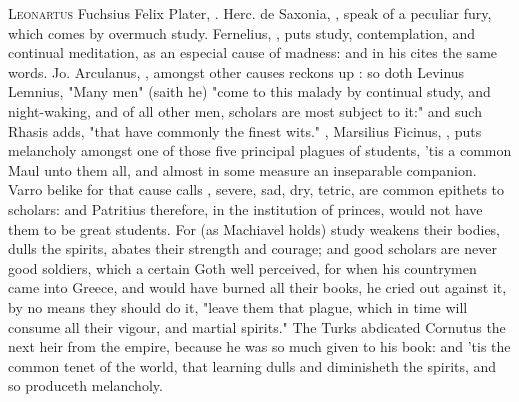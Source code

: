\lettrine{L}{eonartus} Fuchsius  Felix Plater, .
Herc. de Saxonia, , speak
of a peculiar fury, which comes by overmuch study.
Fernelius, , puts
study, contemplation, and continual meditation, as an especial cause of
madness: and in his  cites the same words. Jo.
Arculanus, ,
amongst other causes reckons up : so doth Levinus Lemnius,
"Many men" (saith he) "come to this malady by continual
study, and night-waking, and of all other men, scholars
are most subject to it:" and such Rhasis adds, "that have
commonly the finest wits." ,
Marsilius Ficinus, ,
puts melancholy amongst one of those five principal plagues of students, 'tis a
common Maul unto them all, and almost in some measure an inseparable companion.
Varro belike for that cause calls , severe,
sad, dry, tetric, are common epithets to scholars: and
Patritius therefore, in the institution of princes, would
not have them to be great students. For (as Machiavel holds) study weakens
their bodies, dulls the spirits, abates their strength and courage; and good
scholars are never good soldiers, which a certain Goth well perceived, for when
his countrymen came into Greece, and would have burned all their books, he
cried out against it, by no means they should do it,
"leave them that plague, which in time will consume all
their vigour, and martial spirits." The Turks abdicated
Cornutus the next heir from the empire, because he was so much given to his
book: and 'tis the common tenet of the world, that learning dulls and
diminisheth the spirits, and so  produceth melancholy.

